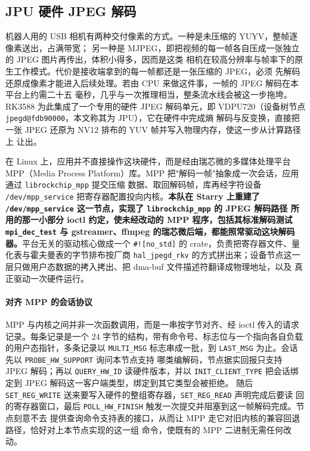 \subsection{JPU 硬件 JPEG 解码}\label{sec:jpu}

机器人用的 USB 相机有两种交付像素的方式。一种是未压缩的 YUYV，整帧逐像素送出，占满带宽；
另一种是 MJPEG，即把视频的每一帧各自压成一张独立的 JPEG 图片再传出，体积小得多，因而是这类
相机在较高分辨率与帧率下的原生工作模式。代价是接收端拿到的每一帧都还是一张压缩的 JPEG，必须
先解码还原成像素才能进入后续处理。若由 CPU 来做这件事，一帧的 JPEG 解码在本平台上约需二十五
毫秒，几乎与一次推理相当，整条流水线会被这一步拖垮。RK3588 为此集成了一个专用的硬件 JPEG
解码单元，即 VDPU720（设备树节点 \texttt{jpegd@fdb90000}，本文称其为 JPU），它在硬件中完成熵
解码与反变换，直接把一张 JPEG 还原为 NV12 排布的 YUV 帧并写入物理内存，使这一步从计算路径上
让出。

在 Linux 上，应用并不直接操作这块硬件，而是经由瑞芯微的多媒体处理平台 MPP（Media Process
Platform）库。MPP 把"解码一帧"抽象成一次会话，应用通过 \texttt{librockchip\_mpp} 提交压缩
数据、取回解码帧，库再经字符设备 \texttt{/dev/mpp\_service} 把寄存器配置投向内核。\textbf{本队在 Starry
上重建了 \texttt{/dev/mpp\_service} 这一节点，实现了 \texttt{librockchip\_mpp} 的 JPEG 解码路径
所用的那一小部分 ioctl 约定，使未经改动的 MPP 程序，包括其标准解码测试 \texttt{mpi\_dec\_test}
与 gstreamer、ffmpeg 的瑞芯微后端，都能照常驱动这块解码器。}平台无关的驱动核心做成一个
\texttt{\#![no\_std]} 的 crate，负责把寄存器文件、量化表与霍夫曼表的字节排布按厂商 \texttt{hal\_jpegd\_rkv}
的方式拼出来；设备节点这一层只做用户态数据的拷入拷出、把 dma-buf 文件描述符翻译成物理地址，以及
真正驱动一次硬件运行。


\paragraph{对齐 MPP 的会话协议}
MPP 与内核之间并非一次函数调用，而是一串按字节对齐、经 ioctl 传入的请求记录。每条记录是一个
24 字节的结构，带有命令号、标志位与一个指向各自负载的用户态指针，多条记录以 \texttt{MULTI\_MSG}
标志串成一批，到 \texttt{LAST\_MSG} 为止。会话先以 \texttt{PROBE\_HW\_SUPPORT} 询问本节点支持
哪类编解码，节点据实回报只支持 JPEG 解码；再以 \texttt{QUERY\_HW\_ID} 读硬件版本，并以
\texttt{INIT\_CLIENT\_TYPE} 把会话绑定到 JPEG 解码这一客户端类型，绑定到其它类型会被拒绝。
随后 \texttt{SET\_REG\_WRITE} 送来要写入硬件的整组寄存器，\texttt{SET\_REG\_READ} 声明完成后要读
回的寄存器窗口，最后 \texttt{POLL\_HW\_FINISH} 触发一次提交并阻塞到这一帧解码完成。节点刻意不去
提供查询命令支持表的接口，从而让 MPP 走它对旧内核的兼容回退路径，恰好对上本节点实现的这一组
命令，使既有的 MPP 二进制无需任何改动。

